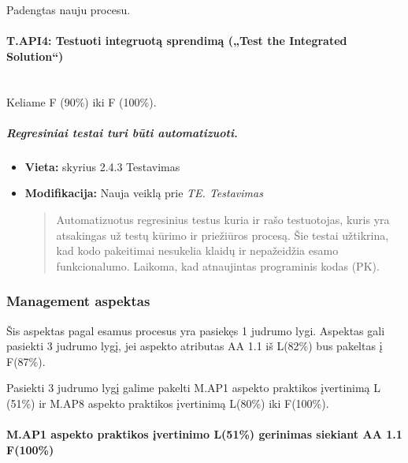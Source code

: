 \documentclass{article}
\newcommand{\subsubsubsection}[1]{\paragraph{#1}\mbox{}\\}
\begin{document}
Padengtas nauju procesu.

\subsubsubsection{T.API4: Testuoti integruotą sprendimą („Test the Integrated Solution“)} 

Keliame F (90\%) iki F (100\%).

\subparagraph{Regresiniai testai turi būti automatizuoti.}
\begin{itemize}
    \item \textbf{Vieta:} skyrius 2.4.3 Testavimas
    \item \textbf{Modifikacija:} Nauja veiklą prie 
    \textit{TE. Testavimas}    \begin{quote}
    Automatizuotus regresinius testus kuria ir rašo testuotojas, kuris yra atsakingas už testų kūrimo ir priežiūros procesą. Šie testai užtikrina, kad kodo pakeitimai nesukelia klaidų ir nepažeidžia esamo funkcionalumo. Laikoma, kad atnaujintas programinis kodas (PK).
    \end{quote}
\end{itemize}



\newpage

\subsubsection{Management aspektas}

Šis aspektas pagal esamus procesus yra pasiekęs 1 judrumo lygi. Aspektas gali pasiekti 3 judrumo lygį, jei
aspekto atributas AA 1.1 iš L(82\%) bus pakeltas į F(87\%).

Pasiekti 3 judrumo lygį galime pakelti M.AP1 aspekto praktikos įvertinimą L (51\%) ir M.AP8 aspekto praktikos įvertinimą L(80\%) iki F(100\%).

\paragraph{M.AP1 aspekto praktikos įvertinimo L(51\%) gerinimas siekiant AA 1.1 F(100\%)}
\end{document}
